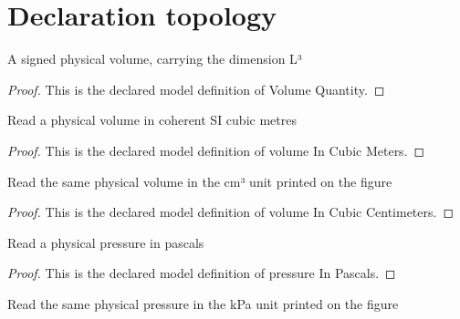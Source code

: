 \section{Declaration topology}
\begin{definition}
  \label{def:physics:phyx-mini-0419:phyxminiproblems-problemphyxmini0419-volumequantity}
  A signed physical volume, carrying the dimension L³
\end{definition}
\begin{proof}
  This is the declared model definition of Volume Quantity.
\end{proof}
\begin{definition}
  \label{def:physics:phyx-mini-0419:phyxminiproblems-problemphyxmini0419-volumeincubicmeters}
  Read a physical volume in coherent SI cubic metres
\end{definition}
\begin{proof}
  This is the declared model definition of volume In Cubic Meters.
\end{proof}
\begin{definition}
  \label{def:physics:phyx-mini-0419:phyxminiproblems-problemphyxmini0419-volumeincubiccentimeters}
  Read the same physical volume in the cm³ unit printed on the figure
\end{definition}
\begin{proof}
  This is the declared model definition of volume In Cubic Centimeters.
\end{proof}
\begin{definition}
  \label{def:physics:phyx-mini-0419:phyxminiproblems-problemphyxmini0419-pressureinpascals}
  Read a physical pressure in pascals
\end{definition}
\begin{proof}
  This is the declared model definition of pressure In Pascals.
\end{proof}
\begin{definition}
  \label{def:physics:phyx-mini-0419:phyxminiproblems-problemphyxmini0419-pressureinkilopascals}
  Read the same physical pressure in the kPa unit printed on the figure
\end{definition}

